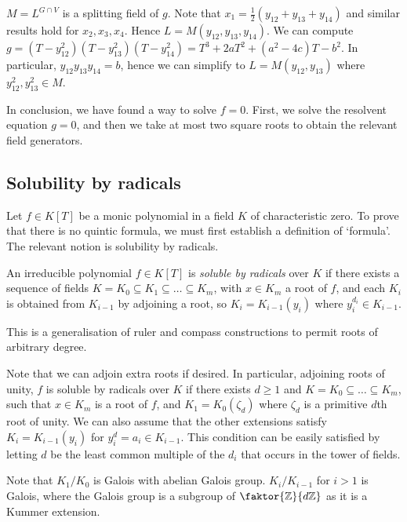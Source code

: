 \( M = L^{G \cap V} \) is a splitting field of \( g \).
Note that \( x_1 = \frac{1}{2}(y_{12} + y_{13} + y_{14}) \) and similar results hold for \( x_2, x_3, x_4 \).
Hence \( L = M(y_{12}, y_{13}, y_{14}) \).
We can compute \( g = (T - y_{12}^2)(T - y_{13}^2)(T - y_{14}^2) = T^3 + 2aT^2 + (a^2 - 4c)T - b^2 \).
In particular, \( y_{12} y_{13} y_{14} = b \), hence we can simplify to \( L = M(y_{12}, y_{13}) \) where \( y_{12}^2, y_{13}^2 \in M \).

In conclusion, we have found a way to solve \( f = 0 \).
First, we solve the resolvent equation \( g = 0 \), and then we take at most two square roots to obtain the relevant field generators.

\subsection{Solubility by radicals}
Let \( f \in K[T] \) be a monic polynomial in a field \( K \) of characteristic zero.
To prove that there is no quintic formula, we must first establish a definition of `formula'.
The relevant notion is solubility by radicals.
\begin{definition}
	An irreducible polynomial \( f \in K[T] \) is \emph{soluble by radicals} over \( K \) if there exists a sequence of fields \( K = K_0 \subseteq K_1 \subseteq \dots \subseteq K_m \), with \( x \in K_m \) a root of \( f \), and each \( K_i \) is obtained from \( K_{i-1} \) by adjoining a root, so \( K_i = K_{i-1}(y_i) \) where \( y_i^{d_i} \in K_{i-1} \).
\end{definition}
\begin{remark}
	This is a generalisation of ruler and compass constructions to permit roots of arbitrary degree.
\end{remark}
Note that we can adjoin extra roots if desired.
In particular, adjoining roots of unity, \( f \) is soluble by radicals over \( K \) if there exists \( d \geq 1 \) and \( K = K_0 \subseteq \dots \subseteq K_m \), such that \( x \in K_m \) is a root of \( f \), and \( K_1 = K_0(\zeta_d) \) where \( \zeta_d \) is a primitive \( d \)th root of unity.
We can also assume that the other extensions satisfy \( K_i = K_{i-1}(y_i) \) for \( y_i^d = a_i \in K_{i-1} \).
This condition can be easily satisfied by letting \( d \) be the least common multiple of the \( d_i \) that occurs in the tower of fields.

Note that \( K_1 / K_0 \) is Galois with abelian Galois group.
\( K_i / K_{i-1} \) for \( i > 1 \) is Galois, where the Galois group is a subgroup of \( \faktor{\mathbb Z}{d\mathbb Z} \) as it is a Kummer extension.

